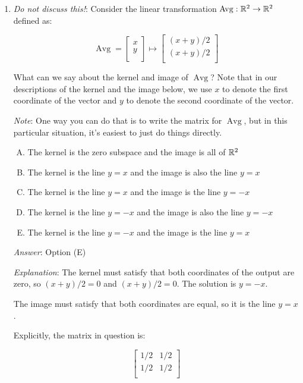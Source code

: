 \documentclass[10pt]{amsart}
\begin{document}
\begin{enumerate}

\item {\em Do not discuss this!}: Consider the linear transformation
  $\operatorname{Avg}:\mathbb{R}^2 \to \mathbb{R}^2$ defined as:

  $$\operatorname{Avg} = \left[ \begin{matrix} x \\ y \\\end{matrix}\right] \mapsto \left[ \begin{matrix} (x + y)/2 \\ (x + y)/2 \\\end{matrix}\right]$$

  What can we say about the kernel and image of $\operatorname{Avg}$?
  Note that in our descriptions of the kernel and the image below, we
  use $x$ to denote the first coordinate of the vector and $y$ to
  denote the second coordinate of the vector.

  {\em Note}: One way you can do that is to write the matrix for
  $\operatorname{Avg}$, but in this particular situation, it's easiest
  to just do things directly.

  \begin{enumerate}[(A)]
  \item The kernel is the zero subspace and the image is all of $\mathbb{R}^2$
  \item The kernel is the line $y = x$ and the image is also the line
    $y = x$
  \item The kernel is the line $y = x$ and the image is the line $y =
    -x$
  \item The kernel is the line $y = -x$ and the image is also the line
    $y = -x$
  \item The kernel is the line $y = -x$ and the image is the line $y = x$
  \end{enumerate}

  {\em Answer}: Option (E)

  {\em Explanation}: The kernel must satisfy that both coordinates of
  the output are zero, so $(x + y)/2 = 0$ and $(x + y)/2 = 0$. The
  solution is $y = -x$.

  The image must satisfy that both coordinates are equal, so it is the
  line $y = x$.

  Explicitly, the matrix in question is:

  $$\left[\begin{matrix} 1/2 & 1/2 \\ 1/2 & 1/2 \\\end{matrix}\right]$$


\end{enumerate}
\end{document}
